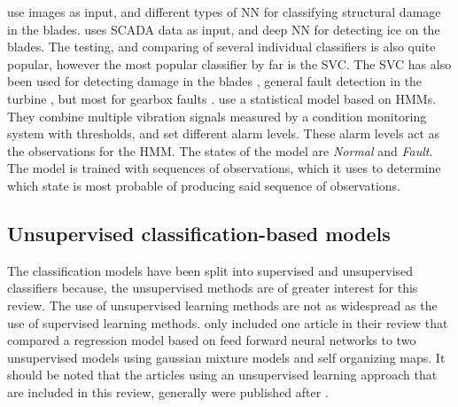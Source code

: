\textcite{image_based_surface_damage_detection_DL_drone_inspection, image_based_YOLO_YSODA, AI_image_analytics_2_classify_blade_defects, blade_defect_detection_imaging_array} use images as input, and different types of NN for classifying structural damage in the blades. \textcite{deep_learning_for_imbalanced_class_detection_bearing_cm} uses SCADA data as input, and deep NN for detecting ice on the blades. The testing, and comparing of several individual classifiers is also quite popular, however the most popular classifier by far is the SVC. The SVC has also been used for detecting damage in the blades \cite{blade_damage_detection_sup_ml_alg}, general fault detection in the turbine \cite{fault_classification_using_CSO_SVM}, but most for gearbox faults \cite{VMD_MPE_COVAL_fault_detection_gearbox,vibration_acustic_decision_tree_SVM_gearbox, integrated_cm_bearing_fault_wt_gearbox, roller_bearings_cm_fisher_score_and_permutation_entropy}. \textcite{fault_monitoring_HMM} use a statistical model based on HMMs. They combine multiple vibration signals measured by a condition monitoring system with thresholds, and set different alarm levels. These alarm levels act as the observations for the HMM. The states of the model are \textit{Normal} and \textit{Fault}. The model is trained with sequences of observations, which it uses to determine which state is most probable of producing said sequence of observations. 

\newpage
\subsection{Unsupervised classification-based models}
The classification models have been split into supervised and unsupervised classifiers because, the unsupervised methods are of greater interest for this review. The use of unsupervised learning methods are not as widespread as the use of supervised learning methods. \textcite{ml_for_wt_cond_monit_rev} only included one article in their review that compared a regression model based on feed forward neural networks to two unsupervised models using gaussian mixture models and self organizing maps. It should be noted that the articles using an unsupervised learning approach that are included in this review, generally were published after \cite{ml_for_wt_cond_monit_rev}.

